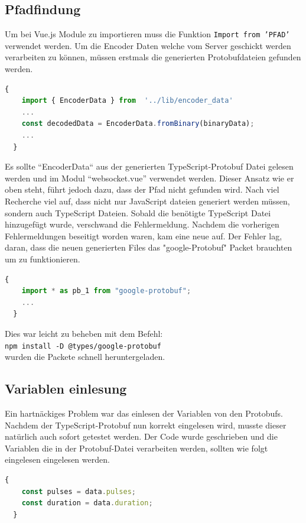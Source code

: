 \subsection{Pfadfindung}
\label{subsubsec:problem_Pfadfindung}
Um bei Vue.js Module zu importieren muss die Funktion \texttt{Import from 'PFAD'} verwendet werden.
%
Um die Encoder Daten welche vom Server geschickt werden verarbeiten zu können, 
müssen erstmals die generierten Protobufdateien gefunden werden.
%
\begin{lstlisting}[language=JavaScript,gobble=4]
  {
    import { EncoderData } from  '../lib/encoder_data'
    ...
    const decodedData = EncoderData.fromBinary(binaryData);
    ...
  }
\end{lstlisting}
Es sollte ``EncoderData`` aus der generierten TypeScript-Protobuf Datei gelesen werden und im Modul ``websocket.vue'' verwendet werden.
Dieser Ansatz wie er oben steht, führt jedoch dazu, dass der Pfad nicht gefunden wird. 
%
Nach viel Recherche viel auf, dass nicht nur JavaScript dateien generiert werden müssen, sondern auch TypeScript Dateien.
Sobald die benötigte TypeScript Datei hinzugefügt wurde, verschwand die Fehlermeldung.
%
Nachdem die vorherigen Fehlermeldungen beseitigt worden waren, kam eine neue auf. 
Der Fehler lag, daran, dass die neuen generierten Files das "google-Protobuf" Packet brauchten um zu funktionieren.
% 
\begin{lstlisting}[language=JavaScript,gobble=4]
  {
    import * as pb_1 from "google-protobuf";
    ...
  }
\end{lstlisting}
Dies war leicht zu beheben mit dem Befehl:\\ \texttt{npm install -D @types/google-protobuf} \\ wurden die Packete schnell
heruntergeladen.

\subsection{Variablen einlesung}
\label{subsubsec:problem_variablen_einlesen}

Ein hartnäckiges Problem war das einlesen der Variablen von den Protobufs. 
%
Nachdem der TypeScript-Protobuf nun korrekt eingelesen wird, 
musste dieser natürlich auch sofort getestet werden.
%
Der Code wurde geschrieben und die Variablen die in der Protobuf-Datei verarbeiten werden, 
sollten wie folgt eingelesen eingelesen werden.
\begin{lstlisting}[language=JavaScript, gobble=4]
  {
    const pulses = data.pulses;
    const duration = data.duration;
  }
\end{lstlisting}


